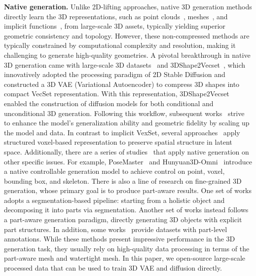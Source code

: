 \documentclass{article} %
\begin{document}
{\bf Native generation.} 
Unlike 2D-lifting approaches, native 3D generation methods directly learn the 3D representations, such as point clouds~\cite{zhou20213d,pointflow,nichol2022point,luo2021diffusion}, meshes~\cite{nash2020polygen,jun2023shap,Liu2023MeshDiffusion}, and implicit functions~\cite{chen2019learning,park2019deepsdf}, from large-scale 3D assets, typically yielding superior geometric consistency and topology. However, these non-compressed methods are typically constrained by computational complexity and resolution, making it challenging to generate high-quality geometries. A pivotal breakthrough in native 3D generation came with large-scale 3D datasets~\cite{objaverse,objaverseXL} and 3DShape2Vecset~\cite{zhang20233dshape2vecset}, which innovatively adopted the processing paradigm of 2D Stable Diffusion and constructed a 3D VAE (Variational Autoencoder) to compress 3D shapes into compact VecSet representation. With this representation, 3DShape2Vecset enabled the construction of diffusion models for both conditional and unconditional 3D generation. Following this workflow, subsequent works~\cite{zhao2024michelangelo,zhang2024clay,li2024craftsman,li2025triposg,wu2024direct3d,chen2025dora,hunyuan3d2025hunyuan3d} strive to enhance the model's generalization ability and geometric fidelity by scaling up the model and data. In contrast to implicit VexSet, several approaches~\cite{ren2024xcube,xiang2024structured,he2025sparseflex,wu2025direct3d,huang2025spar3d} apply structured voxel-based representation to preserve spatial structure in latent space. Additionally, there are a series of studies~\cite{dong2025crossgen,ye2025nano3d} that apply native generation on other specific issues. For example, PoseMaster~\cite{yan2025posemaster} and Hunyuan3D-Omni~\cite{hunyuan3d2025omni} introduce a native controllable generation model to achieve control on point, voxel, bounding box, and skeleton. There is also a line of research on fine-grained 3D generation, whose primary goal is to produce part-aware results. One set of works\cite{yang2025holopart,liu2023partslip,ma2025p3,kim2024partstad,zhong2024meshsegmenter,abdelreheem2023satr,tang2024segment,thai20243x2,xue2023zerops,yang2024sampart3d,liu2024part123, deng2025geosam2,zhou2024point,fischer2024sama,ma2025find,liu2025partfield,zhu2025partsam,paul2025name,li2025auto} adopts a segmentation-based pipeline: starting from a holistic object and decomposing it into parts via segmentation. Another set of works\cite{yan2025x,li2025moca,yang2025omnipart,lin2025partcrafter,tang2025efficient,dong2025one,ding2025fullpart,he2025unipart,yang2025partdiffuser} instead follows a part-aware generation paradigm, directly generating 3D objects with explicit part structures. In addition, some works~\cite{chang2015shapenet,mo2019partnet,collins2022abo,wang2025partnext,dong2025one,yang2024sampart3d,geng2023gapartnet,deng20213d} provide datasets with part-level annotations. While these methods present impressive performance in the 3D generation task, they usually rely on high-quality data processing in terms of the part-aware mesh and watertight mesh. In this paper, we open-source large-scale processed data that can be used to train 3D VAE and diffusion directly.
\end{document}

